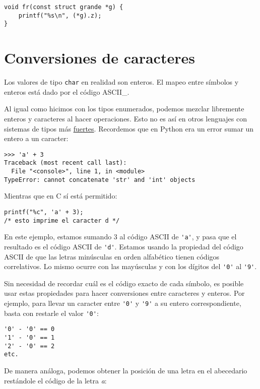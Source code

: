 \begin{lstlisting}
void fr(const struct grande *g) {
    printf("%s\n", (*g).z);
}
\end{lstlisting}

\section{Conversiones de caracteres}

Los valores de tipo \lstinline!char! en realidad son enteros. El mapeo
entre símbolos y enteros está dado por el código ASCII\_.

Al igual como hicimos con los tipos enumerados, podemos mezclar
libremente enteros y caracteres al hacer operaciones. Esto no es así en
otros lenguajes con sistemas de tipos más
\href{http://en.wikipedia.org/wiki/Strong\_typing}{fuertes}. Recordemos
que en Python era un error sumar un entero a un caracter:

\begin{lstlisting}
>>> 'a' + 3
Traceback (most recent call last):
  File "<console>", line 1, in <module>
TypeError: cannot concatenate 'str' and 'int' objects
\end{lstlisting}

Mientras que en C sí está permitido:

\begin{lstlisting}
printf("%c", 'a' + 3);
/* esto imprime el caracter d */
\end{lstlisting}

En este ejemplo, estamos sumando 3 al código ASCII de \lstinline!'a'!, y
pasa que el resultado es el código ASCII de \lstinline!'d'!. Estamos
usando la propiedad del código ASCII de que las letras minúsculas en
orden alfabético tienen códigos correlativos. Lo mismo ocurre con las
mayúsculas y con los dígitos del \lstinline!'0'! al \lstinline!'9'!.

Sin necesidad de recordar cuál es el código exacto de cada símbolo, es
posible usar estas propiedades para hacer conversiones entre caracteres
y enteros. Por ejemplo, para llevar un caracter entre \lstinline!'0'! y
\lstinline!'9'! a su entero correspondiente, basta con restarle el valor
\lstinline!'0'!:

\begin{lstlisting}
'0' - '0' == 0
'1' - '0' == 1
'2' - '0' == 2
etc.
\end{lstlisting}

De manera análoga, podemos obtener la posición de una letra en el
abecedario restándole el código de la letra \emph{a}:

